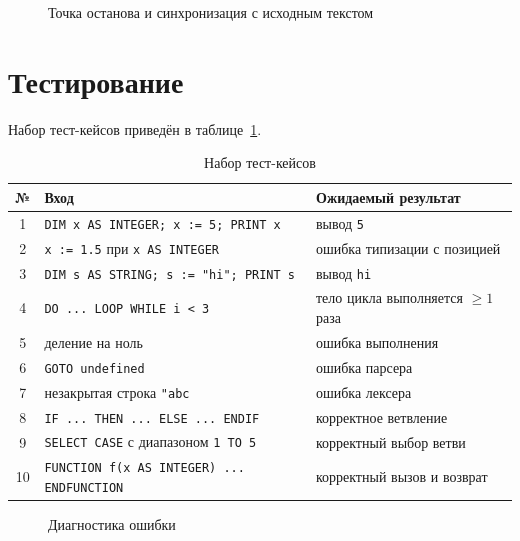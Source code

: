 \documentclass[14pt,a4paper]{article}
\begin{document}
\begin{figure}[H]
  \centering
  \caption{Точка останова и синхронизация с исходным текстом}
  \label{fig:breakpoint}
\end{figure}

\section{Тестирование}

Набор тест-кейсов приведён в таблице~\ref{tab:tests}.

\begin{table}[H]
\caption{Набор тест-кейсов}
\label{tab:tests}
\centering
\begin{tabular}{@{}clp{7cm}@{}}
\toprule
№ & Вход & Ожидаемый результат \\
\midrule
1 & \texttt{DIM x AS INTEGER; x := 5; PRINT x} & вывод \texttt{5} \\
2 & \texttt{x := 1.5} при \texttt{x AS INTEGER} & ошибка типизации с позицией \\
3 & \texttt{DIM s AS STRING; s := "hi"; PRINT s} & вывод \texttt{hi} \\
4 & \texttt{DO ... LOOP WHILE i < 3} & тело цикла выполняется $\ge 1$ раза \\
5 & деление на ноль & ошибка выполнения \\
6 & \texttt{GOTO undefined} & ошибка парсера \\
7 & незакрытая строка \texttt{"abc} & ошибка лексера \\
8 & \texttt{IF ... THEN ... ELSE ... ENDIF} & корректное ветвление \\
9 & \texttt{SELECT CASE} с диапазоном \texttt{1 TO 5} & корректный выбор ветви \\
10 & \texttt{FUNCTION f(x AS INTEGER) ... ENDFUNCTION} & корректный вызов и возврат \\
\bottomrule
\end{tabular}
\end{table}

\begin{figure}[H]
  \centering
  \caption{Диагностика ошибки}
  \label{fig:error}
\end{figure}
\end{document}
